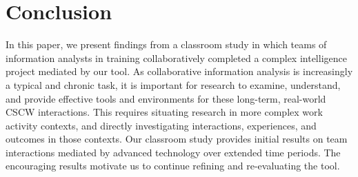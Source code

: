 \section{Conclusion}

In this paper, we present findings from a classroom study in which teams of information analysts in training collaboratively completed a complex intelligence project mediated by our tool. As collaborative information analysis is increasingly a typical and chronic task, it is important for research to examine, understand, and provide effective tools and environments for these long-term, real-world CSCW interactions. This requires situating research in more complex work activity contexts, and directly investigating interactions, experiences, and outcomes in those contexts. Our classroom study provides initial results on team interactions mediated by advanced technology over extended time periods. The encouraging results motivate us to continue refining and re-evaluating the tool.


%
%
%
%
%
